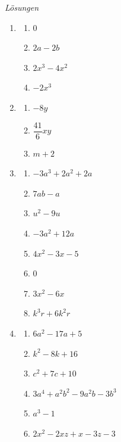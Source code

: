 \clearpage
\emph{Lösungen}
\begin{enumerate}
    \item
          \begin{enumerate}
              \item \(0\)
              \item \(2a-2b\)
              \item \(2x^3-4x^2\)
              \item \(-2x^3\)
          \end{enumerate}

    \item
          \begin{enumerate}
              \item \(-8y\)
              \item \(\dfrac{41}{6}xy\)
              \item \(m+2\)
          \end{enumerate}

    \item
          \begin{enumerate}
              \item \(-3a^3+2a^2+2a\)
              \item \(7ab-a\)
              \item \(u^2-9u\)
              \item \(-3a^2+12a\)
              \item \(4x^2-3x-5\)
              \item \(0\)
              \item \(3x^2-6x\)
              \item \(k^3r+6k^2r\)
          \end{enumerate}

    \item
          \begin{enumerate}
              \item \(6a^2-17a+5\)
              \item \(k^2-8k+16\)
              \item \(c^2+7c+10\)
              \item \(3a^4+a^2b^2-9a^2b-3b^3\)
              \item \(a^3-1\)
              \item \(2x^2-2xz+x-3z-3\)
          \end{enumerate}


\end{enumerate}
